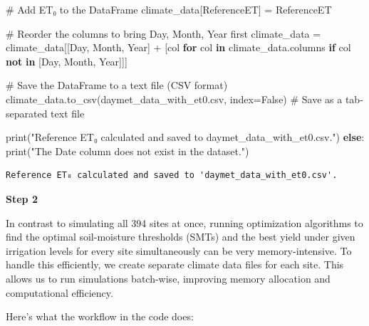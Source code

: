 \documentclass[
  letterpaper,
  DIV=11,
  numbers=noendperiod]{scrartcl}
\newenvironment{Shaded}{\begin{snugshade}}{\end{snugshade}}
\newcommand{\BuiltInTok}[1]{\textcolor[rgb]{0.00,0.23,0.31}{#1}}
\newcommand{\CommentTok}[1]{\textcolor[rgb]{0.37,0.37,0.37}{#1}}
\newcommand{\ControlFlowTok}[1]{\textcolor[rgb]{0.00,0.23,0.31}{\textbf{#1}}}
\newcommand{\KeywordTok}[1]{\textcolor[rgb]{0.00,0.23,0.31}{\textbf{#1}}}
\newcommand{\NormalTok}[1]{\textcolor[rgb]{0.00,0.23,0.31}{#1}}
\newcommand{\OperatorTok}[1]{\textcolor[rgb]{0.37,0.37,0.37}{#1}}
\newcommand{\StringTok}[1]{\textcolor[rgb]{0.13,0.47,0.30}{#1}}
\newcommand{\VariableTok}[1]{\textcolor[rgb]{0.07,0.07,0.07}{#1}}
\begin{document}
\begin{Shaded}
\begin{Highlighting}[]
    \CommentTok{\# Add ET₀ to the DataFrame}
\NormalTok{    climate\_data[}\StringTok{\textquotesingle{}ReferenceET\textquotesingle{}}\NormalTok{] }\OperatorTok{=}\NormalTok{ ReferenceET}

    \CommentTok{\# Reorder the columns to bring Day, Month, Year first}
\NormalTok{    climate\_data }\OperatorTok{=}\NormalTok{ climate\_data[[}\StringTok{\textquotesingle{}Day\textquotesingle{}}\NormalTok{, }\StringTok{\textquotesingle{}Month\textquotesingle{}}\NormalTok{, }\StringTok{\textquotesingle{}Year\textquotesingle{}}\NormalTok{] }\OperatorTok{+}\NormalTok{ [col }\ControlFlowTok{for}\NormalTok{ col }\KeywordTok{in}\NormalTok{ climate\_data.columns }\ControlFlowTok{if}\NormalTok{ col }\KeywordTok{not} \KeywordTok{in}\NormalTok{ [}\StringTok{\textquotesingle{}Day\textquotesingle{}}\NormalTok{, }\StringTok{\textquotesingle{}Month\textquotesingle{}}\NormalTok{, }\StringTok{\textquotesingle{}Year\textquotesingle{}}\NormalTok{]]]}

    \CommentTok{\# Save the DataFrame to a text file (CSV format)}
\NormalTok{    climate\_data.to\_csv(}\StringTok{\textquotesingle{}daymet\_data\_with\_et0.csv\textquotesingle{}}\NormalTok{, index}\OperatorTok{=}\VariableTok{False}\NormalTok{)  }\CommentTok{\# Save as a tab{-}separated text file}

    \BuiltInTok{print}\NormalTok{(}\StringTok{"Reference ET₀ calculated and saved to \textquotesingle{}daymet\_data\_with\_et0.csv\textquotesingle{}."}\NormalTok{)}
\ControlFlowTok{else}\NormalTok{:}
    \BuiltInTok{print}\NormalTok{(}\StringTok{"The \textquotesingle{}Date\textquotesingle{} column does not exist in the dataset."}\NormalTok{)}
\end{Highlighting}
\end{Shaded}

\begin{verbatim}
Reference ET₀ calculated and saved to 'daymet_data_with_et0.csv'.
\end{verbatim}

\textbf{Step 2}

In contrast to simulating all 394 sites at once, running optimization
algorithms to find the optimal soil-moisture thresholds (SMTs) and the
best yield under given irrigation levels for every site simultaneously
can be very memory-intensive. To handle this efficiently, we create
separate climate data files for each site. This allows us to run
simulations batch-wise, improving memory allocation and computational
efficiency.

Here's what the workflow in the code does:
\end{document}
